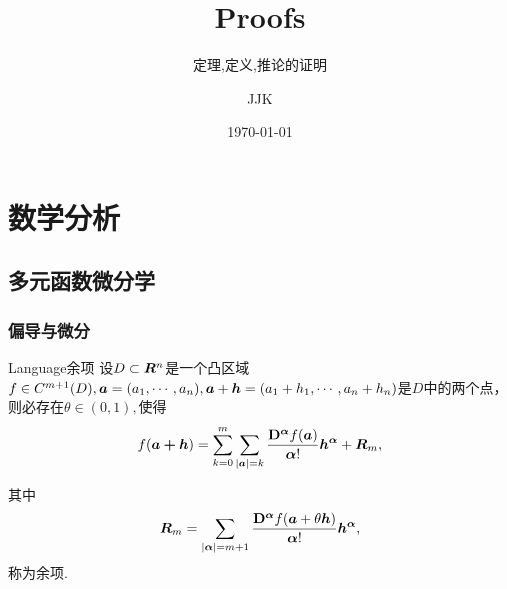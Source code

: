 \documentclass[lang=cn,11pt,normal]{elegantbook}
\title{Proofs}
\subtitle{定理,定义,推论的证明}
\author{JJK}
\institute{Jiang Xi science and technology University}
\date{\today}
\begin{document}
	\maketitle
	\tableofcontents
	\mainmatter
	\hypersetup{pageanchor,bookmarksopen=true}

	\chapter{数学分析}
	\section{多元函数微分学}
	\subsection{偏导与微分}
	\begin{definition}{Language余项}{}
			设$D\subset \boldsymbol{R}^n$是一个凸区域$f \in C^{m+1} (D),\boldsymbol{a}=(a_1,\cdots,a_n),\boldsymbol{a}+\boldsymbol{h}=(a_1+h_1,\cdots,a_n+h_n)$是$D$中的两个点，则必存在$\theta \in (0,1),$使得
			\begin{equation}
			f(\boldsymbol{a+h})=\sum^m_{k=0}\sum_{|\boldsymbol{a}|=k} \frac{\mathbf{D}^{\boldsymbol{\alpha}}f(\boldsymbol{a})}{\boldsymbol{\alpha}!} \boldsymbol{h^\alpha} + \boldsymbol{R}_m,
			\end{equation}
			
			其中
			\begin{gather}
			\boldsymbol{R}_m=\sum_{|\boldsymbol{\alpha}|=m+1} \frac{\mathbf{D}^{\boldsymbol{\alpha}}f(\boldsymbol{a}+\theta \boldsymbol{h})}{\boldsymbol{\alpha}!} \boldsymbol{h^\alpha},
			\end{gather}
			称为余项.
	\end{definition}
\end{document}
